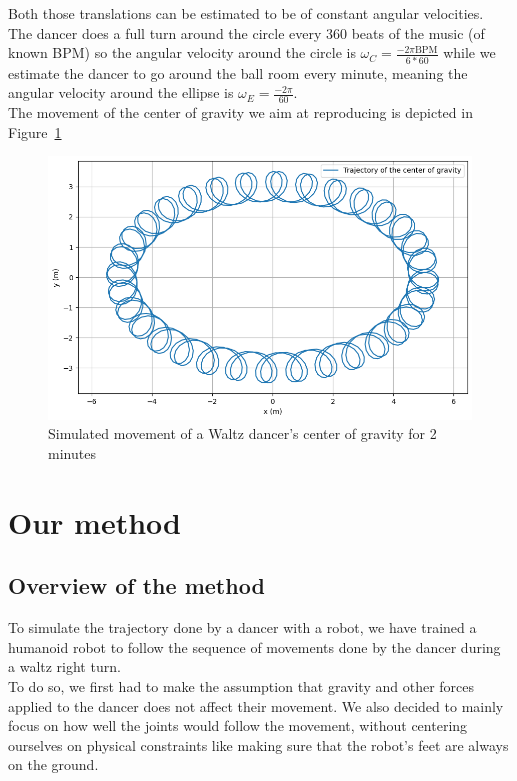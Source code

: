 \documentclass{amsart}
\theoremstyle{definition}
\theoremstyle{plain}
\begin{document}
Both those translations can be estimated to be of constant angular velocities. \\ 

The dancer does a full turn around the circle every 360 beats of the music (of known BPM) so the angular velocity around the circle is $\omega_C = \frac{-2\pi \text{BPM}}{6*60}$ while we estimate the dancer to go around the ball room every minute, meaning the angular velocity around the ellipse is $\omega_E = \frac{-2\pi}{60}$. \\ 

The movement of the center of gravity we aim at reproducing is depicted in Figure~\ref{fig:cog_movement}

\begin{figure}
  \centering
  \includegraphics[width = 0.5 \columnwidth]{img/waltz_cog_movement.png} 
  \caption{Simulated movement of a Waltz dancer's center of gravity for 2 minutes}\label{fig:cog_movement}
\end{figure}

\section{Our method}


\subsection{Overview of the method}
To simulate the trajectory done by a dancer with a robot, we have trained a humanoid robot to follow the sequence of movements done by the dancer during a waltz right turn. \\

To do so, we first had to make the assumption that gravity and other forces applied to the dancer does not affect their movement. We also decided to mainly focus on how well the joints would follow the movement, without centering ourselves on physical constraints like making sure that the robot's feet are always on the ground.\\
\end{document}
